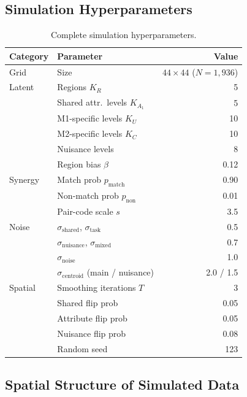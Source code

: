 \documentclass{article}
\theoremstyle{plain}
\theoremstyle{definition}
\begin{document}
\subsection{Simulation Hyperparameters}

\begin{table}[!ht]
\centering
\caption{Complete simulation hyperparameters.}
\label{tab:sim-hyperparams}
\small
\begin{tabular}{llr}
\toprule
Category & Parameter & Value \\
\midrule
Grid        & Size & $44 \times 44$ ($N{=}1{,}936$) \\
\midrule
Latent      & Regions $K_R$ & 5 \\
            & Shared attr.\ levels $K_{A_1}$ & 5 \\
            & M1-specific levels $K_U$ & 10 \\
            & M2-specific levels $K_C$ & 10 \\
            & Nuisance levels & 8 \\
            & Region bias $\beta$ & 0.12 \\
\midrule
Synergy     & Match prob $p_\text{match}$ & 0.90 \\
            & Non-match prob $p_\text{non}$ & 0.01 \\
            & Pair-code scale $s$ & 3.5 \\
\midrule
Noise       & $\sigma_\text{shared}$, $\sigma_\text{task}$ & 0.5 \\
            & $\sigma_\text{nuisance}$, $\sigma_\text{mixed}$ & 0.7 \\
            & $\sigma_\text{noise}$ & 1.0 \\
            & $\sigma_\text{centroid}$ (main / nuisance) & 2.0 / 1.5 \\
\midrule
Spatial     & Smoothing iterations $T$ & 3 \\
            & Shared flip prob & 0.05 \\
            & Attribute flip prob & 0.05 \\
            & Nuisance flip prob & 0.08 \\
\midrule
            & Random seed & 123 \\
\bottomrule
\end{tabular}
\end{table}

\subsection{Spatial Structure of Simulated Data}\label{app:spatial}
\end{document}
